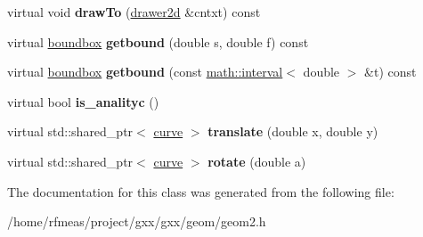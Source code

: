 \begin{DoxyCompactItemize}
\item 
virtual void {\bfseries draw\+To} (\hyperlink{classgxx_1_1drawer2d}{drawer2d} \&cntxt) const \hypertarget{classgxx_1_1geom2_1_1curve_a46cca40ecc2dbdd16b7c03bcee4459d3}{}\label{classgxx_1_1geom2_1_1curve_a46cca40ecc2dbdd16b7c03bcee4459d3}

\item 
virtual \hyperlink{structgxx_1_1geom2_1_1boundbox}{boundbox} {\bfseries getbound} (double s, double f) const \hypertarget{classgxx_1_1geom2_1_1curve_a7c6d834c3fb4e5a7b67965a48631bd41}{}\label{classgxx_1_1geom2_1_1curve_a7c6d834c3fb4e5a7b67965a48631bd41}

\item 
virtual \hyperlink{structgxx_1_1geom2_1_1boundbox}{boundbox} {\bfseries getbound} (const \hyperlink{classgxx_1_1math_1_1interval}{math\+::interval}$<$ double $>$ \&t) const \hypertarget{classgxx_1_1geom2_1_1curve_a7e13d3fcd4107ae44cbb77374c70ff46}{}\label{classgxx_1_1geom2_1_1curve_a7e13d3fcd4107ae44cbb77374c70ff46}

\item 
virtual bool {\bfseries is\+\_\+analityc} ()\hypertarget{classgxx_1_1geom2_1_1curve_ace29dec87aeaededcf8f6ad4d67aca23}{}\label{classgxx_1_1geom2_1_1curve_ace29dec87aeaededcf8f6ad4d67aca23}

\item 
virtual std\+::shared\+\_\+ptr$<$ \hyperlink{classgxx_1_1geom2_1_1curve}{curve} $>$ {\bfseries translate} (double x, double y)\hypertarget{classgxx_1_1geom2_1_1curve_a4d9d1bbdfba0a76a989043eaed94d078}{}\label{classgxx_1_1geom2_1_1curve_a4d9d1bbdfba0a76a989043eaed94d078}

\item 
virtual std\+::shared\+\_\+ptr$<$ \hyperlink{classgxx_1_1geom2_1_1curve}{curve} $>$ {\bfseries rotate} (double a)\hypertarget{classgxx_1_1geom2_1_1curve_a316c920a9348fb891a5b2324f9f3a355}{}\label{classgxx_1_1geom2_1_1curve_a316c920a9348fb891a5b2324f9f3a355}

\end{DoxyCompactItemize}


The documentation for this class was generated from the following file\+:\begin{DoxyCompactItemize}
\item 
/home/rfmeas/project/gxx/gxx/geom/geom2.\+h\end{DoxyCompactItemize}
